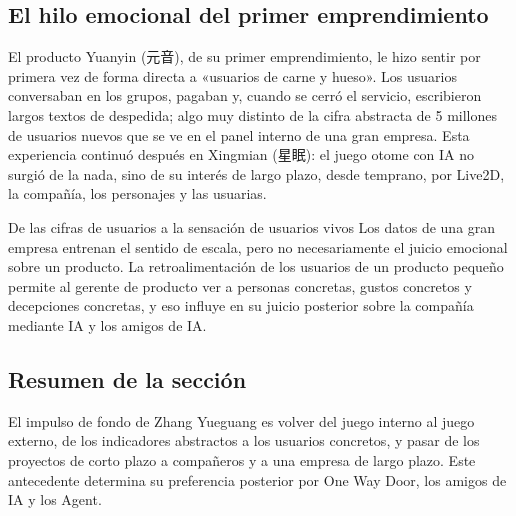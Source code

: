 \subsection{El hilo emocional del primer emprendimiento}

El producto Yuanyin (元音), de su primer emprendimiento, le hizo sentir por primera vez de forma directa a «usuarios de carne y hueso». Los usuarios conversaban en los grupos, pagaban y, cuando se cerró el servicio, escribieron largos textos de despedida; algo muy distinto de la cifra abstracta de 5 millones de usuarios nuevos que se ve en el panel interno de una gran empresa. Esta experiencia continuó después en Xingmian (星眠): el juego otome con IA no surgió de la nada, sino de su interés de largo plazo, desde temprano, por Live2D, la compañía, los personajes y las usuarias.

\begin{knowledgebox}{De las cifras de usuarios a la sensación de usuarios vivos}
Los datos de una gran empresa entrenan el sentido de escala, pero no necesariamente el juicio emocional sobre un producto. La retroalimentación de los usuarios de un producto pequeño permite al gerente de producto ver a personas concretas, gustos concretos y decepciones concretas, y eso influye en su juicio posterior sobre la compañía mediante IA y los amigos de IA.
\end{knowledgebox}

\subsection{Resumen de la sección}

El impulso de fondo de Zhang Yueguang es volver del juego interno al juego externo, de los indicadores abstractos a los usuarios concretos, y pasar de los proyectos de corto plazo a compañeros y a una empresa de largo plazo. Este antecedente determina su preferencia posterior por One Way Door, los amigos de IA y los Agent.
